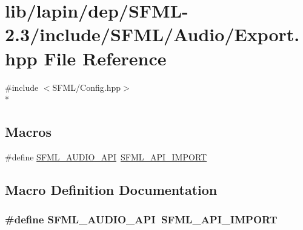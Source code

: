 \hypertarget{lapin_2dep_2_s_f_m_l-2_83_2include_2_s_f_m_l_2_audio_2_export_8hpp}{\section{lib/lapin/dep/\-S\-F\-M\-L-\/2.3/include/\-S\-F\-M\-L/\-Audio/\-Export.hpp File Reference}
\label{lapin_2dep_2_s_f_m_l-2_83_2include_2_s_f_m_l_2_audio_2_export_8hpp}
}
{\ttfamily \#include $<$S\-F\-M\-L/\-Config.\-hpp$>$}\\*
\subsection*{Macros}
\begin{DoxyCompactItemize}
\item 
\#define \hyperlink{lapin_2dep_2_s_f_m_l-2_83_2include_2_s_f_m_l_2_audio_2_export_8hpp_a4d34c0f253824ac49bdd93545913eb89}{S\-F\-M\-L\-\_\-\-A\-U\-D\-I\-O\-\_\-\-A\-P\-I}~\hyperlink{sfml_2dep_2_s_f_m_l-2_84_82_2include_2_s_f_m_l_2_config_8hpp_aba0bbe5791bee6633caa835c7f6a12a4}{S\-F\-M\-L\-\_\-\-A\-P\-I\-\_\-\-I\-M\-P\-O\-R\-T}
\end{DoxyCompactItemize}


\subsection{Macro Definition Documentation}
\hypertarget{lapin_2dep_2_s_f_m_l-2_83_2include_2_s_f_m_l_2_audio_2_export_8hpp_a4d34c0f253824ac49bdd93545913eb89}{
\subsubsection[{S\-F\-M\-L\-\_\-\-A\-U\-D\-I\-O\-\_\-\-A\-P\-I}]{\setlength{\rightskip}{0pt plus 5cm}\#define S\-F\-M\-L\-\_\-\-A\-U\-D\-I\-O\-\_\-\-A\-P\-I~{\bf S\-F\-M\-L\-\_\-\-A\-P\-I\-\_\-\-I\-M\-P\-O\-R\-T}}}\label{lapin_2dep_2_s_f_m_l-2_83_2include_2_s_f_m_l_2_audio_2_export_8hpp_a4d34c0f253824ac49bdd93545913eb89}
